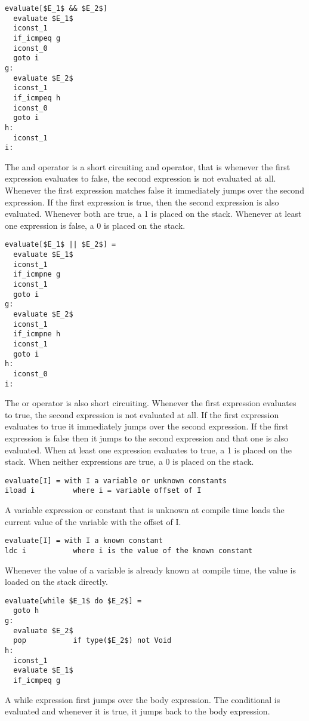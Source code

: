 \begin{lstlisting}  
evaluate[$E_1$ && $E_2$]
  evaluate $E_1$
  iconst_1
  if_icmpeq g
  iconst_0
  goto i
g:
  evaluate $E_2$
  iconst_1
  if_icmpeq h
  iconst_0
  goto i
h:
  iconst_1
i:
\end{lstlisting}

The and operator is a short circuiting and operator, that is whenever the first expression evaluates to false, the second expression is not evaluated at all. Whenever the first expression matches false it immediately jumps over the second expression. If the first expression is true, then the second expression is also evaluated. Whenever both are true, a 1 is placed on the stack. Whenever at least one expression is false, a 0 is placed on the stack.

\begin{lstlisting}
evaluate[$E_1$ || $E_2$] =
  evaluate $E_1$
  iconst_1
  if_icmpne g
  iconst_1
  goto i
g:
  evaluate $E_2$
  iconst_1
  if_icmpne h
  iconst_1
  goto i
h:
  iconst_0
i:
\end{lstlisting}

The or operator is also short circuiting. Whenever the first expression evaluates to true, the second expression is not evaluated at all. If the first expression evaluates to true it immediately jumps over the second expression. If the first expression is false then it jumps to the second expression and that one is also evaluated. When at least one expression evaluates to true, a 1 is placed on the stack. When neither expressions are true, a 0 is placed on the stack.

\begin{lstlisting}  
evaluate[I] = with I a variable or unknown constants
iload i			where i = variable offset of I
\end{lstlisting}  

A variable expression or constant that is unknown at compile time loads the current value of the variable with the offset of I.

\begin{lstlisting}  
evaluate[I] = with I a known constant
ldc i			where i is the value of the known constant
\end{lstlisting}  

Whenever the value of a variable is already known at compile time, the value is loaded on the stack directly.

\begin{lstlisting}
evaluate[while $E_1$ do $E_2$] =
  goto h
g:
  evaluate $E_2$
  pop           if type($E_2$) not Void
h:
  iconst_1  
  evaluate $E_1$
  if_icmpeq g    
\end{lstlisting}
A while expression first jumps over the body expression. The conditional is evaluated and whenever it is true, it jumps back to the body expression.